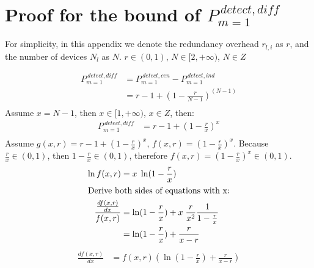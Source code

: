 \documentclass[sigconf]{acmart}
\begin{document}
\appendix



\section{Proof for the bound of $P_{m=1}^{\:detect,\mathit{diff}}$}
\label{appendix:proof_diff}

For simplicity, in this appendix we denote the redundancy overhead $r_{l,i}$  as $r$, and the number of devices $N_l$ as $N$. 
$r\in (0,1)$, $N\in [2, +\infty)$, $N\in Z$

\begin{equation}
\begin{split}
P_{m=1}^{\:detect,\mathit{diff}} &= P_{m=1}^{\:detect, cen}-P_{m=1}^{\:detect, ind} \\
&= r - 1 + (1-\frac{r}{N-1})^{({N}-1)} \\
\end{split}
\end{equation}
Assume $x=N-1$, then $x\in [1, +\infty)$, $x\in Z$, then:
\begin{equation}
\begin{split}
P_{m=1}^{\:detect,\mathit{diff}} &= r - 1 + (1-\frac{r}{x})^{x} \\
\end{split}
\end{equation}
Assume $g(x,r) = r - 1 + (1-\frac{r}{x})^{x}$, $f(x,r) = (1-\frac{r}{x})^{x}$. Because $\frac{r}{x} \in (0,1)$, then $1-\frac{r}{x} \in (0,1)$, therefore $f(x,r)=(1-\frac{r}{x})^{x} \in (0,1)$.
\begin{equation}
\begin{split}
\ln f(x,r) &= x\; \ln (1-\frac{r}{x}) \\
\intertext{Derive both sides of equations with x:}
\frac{\frac{df(x,r)}{dx}}{f(x,r)} &= \ln (1-\frac{r}{x}) + x\; \frac{r}{x^2} \frac{1}{1-\frac{r}{x}} \\
&= \ln (1-\frac{r}{x}) + \frac{r}{x-r} \\
\end{split}
\end{equation}
\begin{equation}
\label{eq:fandh}
\begin{split}
{\frac{df(x,r)}{dx}} &= f(x,r) \left(\ln (1-\frac{r}{x}) + \frac{r}{x-r}\right) \\
\end{split}
\end{equation}
\end{document}

